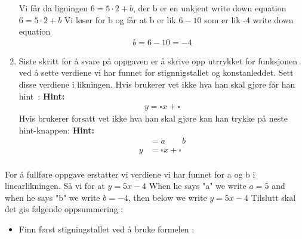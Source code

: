 \documentclass[12pt,twoside,onecolumn]{article}
\begin{document}
\begin{Exercise}
\begin{enumerate}
\begin{figure}[h!]
\end{figure}
{\color{gray} Vi får da ligningen $6=5\cdot 2+b$, der b er en unkjent} \newline
{\color{PineGreen} write down equation 
\newline
$6=5\cdot 2+b$}
\newline
{\color{gray} Vi løser for b og får at b er lik $6-10$ som er lik -4}
\newline
{\color{PineGreen} write down equation
\begin{align}
b=6-10=-4
\end{align}}

\item Siste skritt for å svare på oppgaven er å skrive opp utrrykket for funksjonen ved å sette verdiene vi har funnet for stignnigstallet og konstanleddet.
\newline
Sett disse verdiene i likningen.
\newline
{\color{Maroon} Hvis brukerer vet ikke hva han skal gjøre får han \mbox{hint :}} 
\newline
\newline
\textbf{Hint:}
\begin{align}
y = \square x + \square
\end{align}
{\color{Maroon} Hvis brukerer forsatt vet ikke hva han skal gjøre kan han trykke på neste hint-knappen:}
\newline
\newline
\textbf{Hint:}
\begin{align}
  &= a \qquad b\\ 
y &= \square x + \square\\
\end{align}
\end{enumerate}
{\color{gray}For å fullføre oppgave erstatter vi verdiene vi har funnet for a og b i linearlikningen. Så vi for at $y=5x-4$}
\newline
{\color{PineGreen} When he says "a" we write $a=5$ and when he says "b" we write $b=-4$, then below we write $y=5x-4$} 
\newline
\newline
{\color{Maroon}Tilslutt skal det gis følgende oppsummering :}
\begin{itemize}
\item Finn først stigningstallet ved å bruke formelen :
\begin{align}

\end{align}
\end{itemize}
\end{Exercise}
\end{document}
